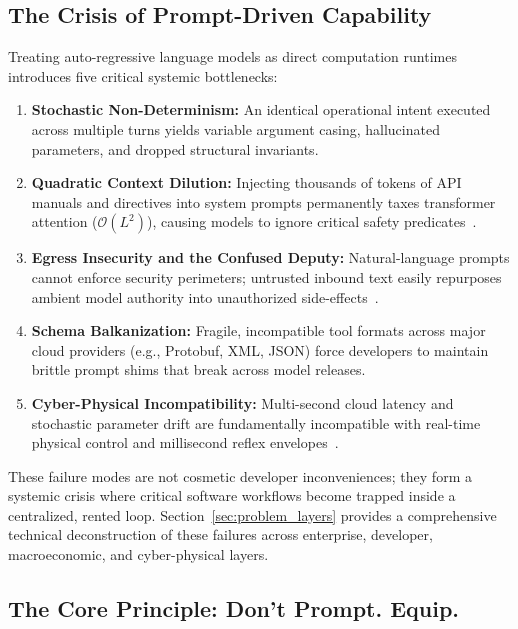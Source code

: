 \subsection{The Crisis of Prompt-Driven Capability}
\label{subsec:five_flaws}

Treating auto-regressive language models as direct computation runtimes introduces five critical systemic bottlenecks:
\begin{enumerate}[leftmargin=*]
  \item \textbf{Stochastic Non-Determinism:} An identical operational intent executed across multiple turns yields variable argument casing, hallucinated parameters, and dropped structural invariants.
  \item \textbf{Quadratic Context Dilution:} Injecting thousands of tokens of API manuals and directives into system prompts permanently taxes transformer attention ($\mathcal{O}(L^2)$), causing models to ignore critical safety predicates~\cite{liu2024lost}.
  \item \textbf{Egress Insecurity and the Confused Deputy:} Natural-language prompts cannot enforce security perimeters; untrusted inbound text easily repurposes ambient model authority into unauthorized side-effects~\cite{greshake2023not, liu2023promptinjection}.
  \item \textbf{Schema Balkanization:} Fragile, incompatible tool formats across major cloud providers (e.g., Protobuf, XML, JSON) force developers to maintain brittle prompt shims that break across model releases.
  \item \textbf{Cyber-Physical Incompatibility:} Multi-second cloud latency and stochastic parameter drift are fundamentally incompatible with real-time physical control and millisecond reflex envelopes~\cite{ahn2022can, brohan2023rt2, willett2023speech}.
\end{enumerate}

These failure modes are not cosmetic developer inconveniences; they form a systemic crisis where critical software workflows become trapped inside a centralized, rented loop. Section~\ref{sec:problem_layers} provides a comprehensive technical deconstruction of these failures across enterprise, developer, macroeconomic, and cyber-physical layers.

\subsection{The Core Principle: Don't Prompt. Equip.}
\label{subsec:thesis}

